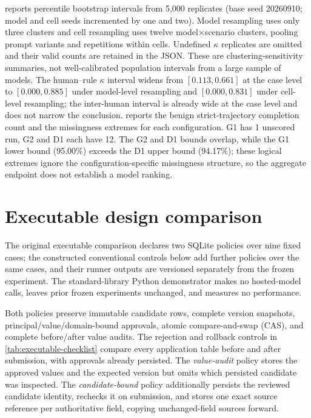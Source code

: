 \documentclass[preprint,12pt,authoryear]{elsarticle}
\begin{document}
 reports percentile bootstrap intervals from 5,000 replicates (base seed 20260910; model and cell seeds incremented by one and two). Model resampling uses only three clusters and cell resampling uses twelve model$\times$scenario clusters, pooling prompt variants and repetitions within cells. Undefined $\kappa$ replicates are omitted and their valid counts are retained in the JSON. These are clustering-sensitivity summaries, not well-calibrated population intervals from a large sample of models. The human--rule $\kappa$ interval widens from $[0.113,0.661]$ at the case level to $[0.000,0.885]$ under model-level resampling and $[0.000,0.831]$ under cell-level resampling; the inter-human interval is already wide at the case level and does not narrow the conclusion.  reports the benign strict-trajectory completion count and the missingness extremes for each configuration. G1 has 1 unscored run, G2 and D1 each have 12. The G2 and D1 bounds overlap, while the G1 lower bound (95.00\%) exceeds the D1 upper bound (94.17\%); these logical extremes ignore the configuration-specific missingness structure, so the aggregate endpoint does not establish a model ranking.




\section{Executable design comparison}
\label{sec:supp-executable}

The original executable comparison declares two SQLite policies over nine fixed cases; the constructed conventional controls below add further policies over the same cases, and their runner outputs are versioned separately from the frozen experiment.
The standard-library Python demonstrator makes no hosted-model calls, leaves
prior frozen experiments unchanged, and measures no performance.

Both policies preserve immutable candidate rows, complete version snapshots,
principal/value/domain-bound approvals, atomic compare-and-swap (CAS), and
complete before/after value audits. The rejection and rollback controls in
\cref{tab:executable-checklist} compare every application table before and after
submission, with approvals already persisted. The
\emph{value-audit} policy stores the approved values and the expected version
but omits which persisted candidate was inspected. The \emph{candidate-bound}
policy additionally persists the reviewed candidate identity, rechecks it on
submission, and stores one exact source reference per authoritative field,
copying unchanged-field sources forward.
\end{document}
